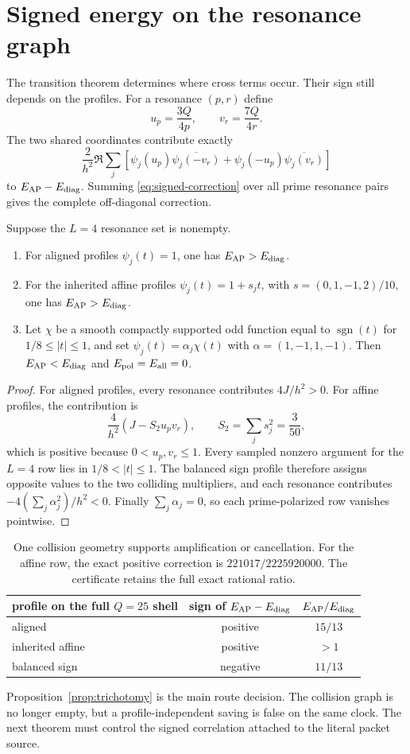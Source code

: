 \section{Signed energy on the resonance graph}

The transition theorem determines where cross terms occur.  Their sign still depends on
the profiles.  For a resonance $(p,r)$ define
\[
 u_p=\frac{3Q}{4p},\qquad v_r=\frac{7Q}{4r}.
\]
The two shared coordinates contribute exactly
\begin{equation}
 \frac{2}{h^2}\Re\sum_j\left[
 \psi_j(u_p)\overline{\psi_j(-v_r)}+
 \psi_j(-u_p)\overline{\psi_j(v_r)}
 \right]
 \label{eq:signed-correction}
\end{equation}
to $E_{\mathrm{AP}}-E_{\mathrm{diag}}$.  Summing \eqref{eq:signed-correction} over all prime resonance
pairs gives the complete off-diagonal correction.

\begin{proposition}
\label{prop:trichotomy}
Suppose the $L=4$ resonance set is nonempty.
\begin{enumerate}[leftmargin=2em]
  \item For aligned profiles $\psi_j(t)=1$, one has $E_{\mathrm{AP}}>E_{\mathrm{diag}}$.
  \item For the inherited affine profiles $\psi_j(t)=1+s_jt$, with
  $s=(0,1,-1,2)/10$, one has $E_{\mathrm{AP}}>E_{\mathrm{diag}}$.
  \item Let $\chi$ be a smooth compactly supported odd function equal to
  $\operatorname{sgn}(t)$ for $1/8\le|t|\le1$, and set
  $\psi_j(t)=\alpha_j\chi(t)$ with $\alpha=(1,-1,1,-1)$.  Then
  $E_{\mathrm{AP}}<E_{\mathrm{diag}}$ and $E_{\mathrm{pol}}=E_{\mathrm{all}}=0$.
\end{enumerate}
\end{proposition}

\begin{proof}
For aligned profiles, every resonance contributes $4J/h^2>0$.  For affine
profiles, the contribution is
\[
 \frac4{h^2}\left(J-S_2u_pv_r\right),
 \qquad S_2=\sum_js_j^2=\frac3{50},
\]
which is positive because $0<u_p,v_r\le1$.  Every sampled nonzero argument for the
$L=4$ row lies in $1/8<|t|\le1$.  The balanced sign profile therefore assigns
opposite values to the two colliding multipliers, and each resonance contributes
$-4(\sum_j\alpha_j^2)/h^2<0$.  Finally $\sum_j\alpha_j=0$, so each prime-polarized
row vanishes pointwise.
\end{proof}

\begin{table}[t]
\centering
\small
\begin{tabular}{lcc}
\toprule
profile on the full $Q=25$ shell & sign of $E_{\mathrm{AP}}-E_{\mathrm{diag}}$ & $E_{\mathrm{AP}}/E_{\mathrm{diag}}$ \\
\midrule
aligned & positive & $15/13$ \\
inherited affine & positive & $>1$ \\
balanced sign & negative & $11/13$ \\
\bottomrule
\end{tabular}
\caption{One collision geometry supports amplification or cancellation.  For the
affine row, the exact positive correction is $221017/2225920000$.  The certificate
retains the full exact rational ratio.}
\label{tab:profiles}
\end{table}

Proposition~\ref{prop:trichotomy} is the main route decision.  The collision graph is
no longer empty, but a profile-independent saving is false on the same clock.  The
next theorem must control the signed correlation attached to the literal packet source.
